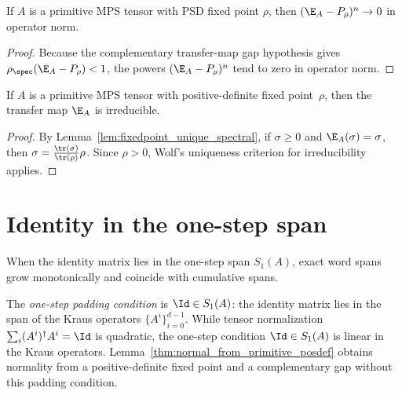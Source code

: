 \begin{lemma}%
    \label{lem:complement_pow_zero}
    \leanok
    If $A$ is a primitive MPS tensor with PSD fixed point $\rho$,
    then $(\E_A-P_\rho)^n\to0$ in operator norm.
\end{lemma}

\begin{proof}\leanok
    Because the complementary transfer-map gap hypothesis gives
    $\rho_{\spec}(\E_A-P_\rho)<1$, the powers $(\E_A-P_\rho)^n$ tend to zero
    in operator norm.
\end{proof}

\begin{lemma}%
    \label{lem:irreducible_map_from_primitive}
    \leanok
    If $A$ is a primitive MPS tensor with positive-definite fixed
    point~$\rho$, then the transfer map $\E_A$ is irreducible.
\end{lemma}

\begin{proof}
    \leanok
    By Lemma~\ref{lem:fixedpoint_unique_spectral},
    if $\sigma\ge0$ and $\E_A(\sigma)=\sigma$, then
    $\sigma=\frac{\tr(\sigma)}{\tr(\rho)}\rho$.
    Since $\rho>0$, Wolf's uniqueness criterion for
    irreducibility applies.
\end{proof}

\section{Identity in the one-step span}
\label{sec:app_wielandt_identity_in_span}

When the identity matrix lies in the one-step span $S_1(A)$, exact word spans
grow monotonically and coincide with cumulative spans.

\begin{remark}
    \label{rem:aperiodicity}\leanok
    The \emph{one-step padding condition} is $\Id\in S_1(A)$: the identity
    matrix lies in the span of the Kraus operators $\{A^i\}_{i=0}^{d-1}$. While
    tensor normalization $\sum_i(A^i)^\dagger A^i=\Id$ is quadratic, the
    one-step condition $\Id\in S_1(A)$ is linear in the Kraus operators.
    Lemma~\ref{thm:normal_from_primitive_posdef} obtains normality from
    a positive-definite fixed point and a complementary gap without this
    padding condition.
\end{remark}

